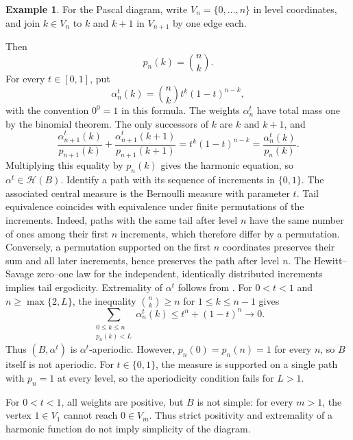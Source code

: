 \documentclass[11pt]{amsart}
\theoremstyle{definition}
\newtheorem{example}[theorem]{Example}
\theoremstyle{remark}
\begin{document}
\begin{example}\label{ex:pascal-harmonic}
For the Pascal diagram, write $V_n=\{0,\ldots,n\}$ in level coordinates,
and join $k\in V_n$ to $k$ and $k+1$ in $V_{n+1}$ by one edge each.
\begin{center}
\end{center}
Then
\[
 p_n(k)=\binom nk.
\]
For every $t\in[0,1]$, put
\[
 \alpha_n^t(k)=\binom nk t^k(1-t)^{n-k},
\]
with the convention $0^0=1$ in this formula.
The weights $\alpha_n^t$ have total mass one by the binomial theorem.
The only successors of $k$ are $k$ and $k+1$, and
\[
 \frac{\alpha_{n+1}^t(k)}{p_{n+1}(k)}
 +\frac{\alpha_{n+1}^t(k+1)}{p_{n+1}(k+1)}
 =t^k(1-t)^{n-k}
 =\frac{\alpha_n^t(k)}{p_n(k)}.
\]
Multiplying this equality by $p_n(k)$ gives the harmonic equation, so
$\alpha^t\in\mathcal H(B)$.
Identify a path with its sequence of increments in $\{0,1\}$.
The associated central measure is the Bernoulli measure with parameter $t$.
Tail equivalence coincides with equivalence under finite permutations
of the increments.  Indeed, paths with the same tail after level $n$
have the same number of ones among their first $n$ increments, which
therefore differ by a permutation.  Conversely, a permutation supported
on the first $n$ coordinates preserves their sum and all later
increments, hence preserves the path after level $n$.
The Hewitt--Savage zero--one law for the independent, identically
distributed increments implies tail ergodicity.  Extremality of
$\alpha^t$ follows from .
For $0<t<1$ and $n\geq\max\{2,L\}$, the inequality
$\binom nk\geq n$ for $1\leq k\leq n-1$ gives
\[
 \sum_{\substack{0\leq k\leq n\\p_n(k)<L}}\alpha_n^t(k)
 \leq t^n+(1-t)^n\longrightarrow0.
\]
Thus $(B,\alpha^t)$ is $\alpha^t$-aperiodic.
However, $p_n(0)=p_n(n)=1$ for every $n$, so $B$ itself is not aperiodic.
For $t\in\{0,1\}$, the measure is supported on a single path with
$p_n=1$ at every level, so the aperiodicity condition fails for $L>1$.

For $0<t<1$, all weights are positive, but $B$ is not simple:
for every $m>1$, the vertex $1\in V_1$ cannot reach $0\in V_m$.
Thus strict positivity and extremality of a harmonic function do not
imply simplicity of the diagram.
\end{example}
\end{document}
